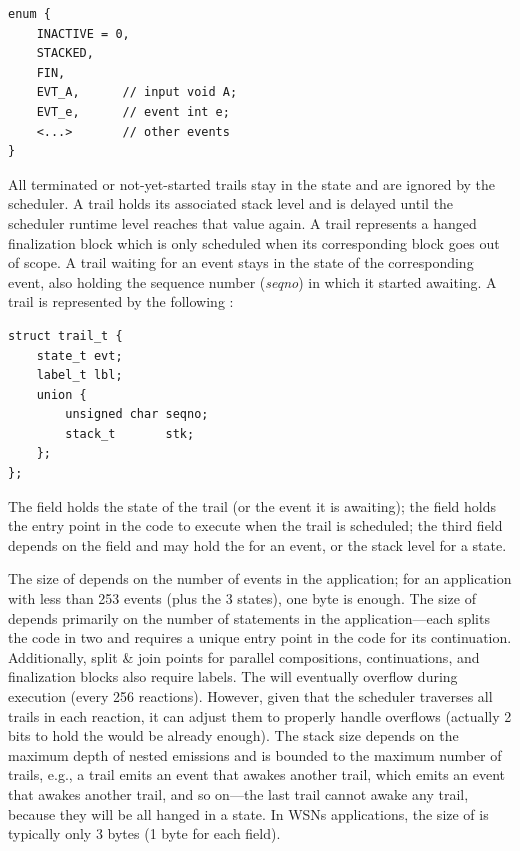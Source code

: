 \begin{lstlisting}
enum {
    INACTIVE = 0,
    STACKED,
    FIN,
    EVT_A,      // input void A;
    EVT_e,      // event int e;
    <...>       // other events
}
\end{lstlisting}

All terminated or not-yet-started trails stay in the  state and 
are ignored by the scheduler.
%
A  trail holds its associated stack level and is delayed until 
the scheduler runtime level reaches that value again.
%
A  trail represents a hanged finalization block which is only 
scheduled when its corresponding block goes out of scope.
%
A trail waiting for an event stays in the state of the corresponding event, 
also holding the sequence number (\emph{seqno}) in which it started awaiting.
%
A trail is represented by the following :

\begin{lstlisting}
struct trail_t {
    state_t evt;
    label_t lbl;
    union {
        unsigned char seqno;
        stack_t       stk;
    };
};
\end{lstlisting}

The field  holds the state of the trail (or the event it is 
awaiting); the field  holds the entry point in the code to execute 
when the trail is scheduled; the third field depends on the  field 
and may hold the  for an event, or the stack level  for a
 state.

The size of  depends on the number of events in the application;
for an application with less than 253 events (plus the 3 states), one byte is 
enough.
%
The size of  depends primarily on the number of  
statements in the application---each  splits the code in two and 
requires a unique entry point in the code for its continuation.
Additionally, split \& join points for parallel compositions,  
continuations, and finalization blocks also require labels.
%
The  will eventually overflow during execution (every 256 
reactions).
However, given that the scheduler traverses all trails in each reaction, it can 
adjust them to properly handle overflows (actually 2 bits to hold the 
 would be already enough).
%
The stack size depends on the maximum depth of nested emissions and is bounded 
to the maximum number of trails, e.g., a trail emits an event that awakes 
another trail, which emits an event that awakes another trail, and so on---the 
last trail cannot awake any trail, because they will be all hanged in a 
 state.
%
In WSNs applications, the size of  is typically only 3 bytes (1 
byte for each field).

